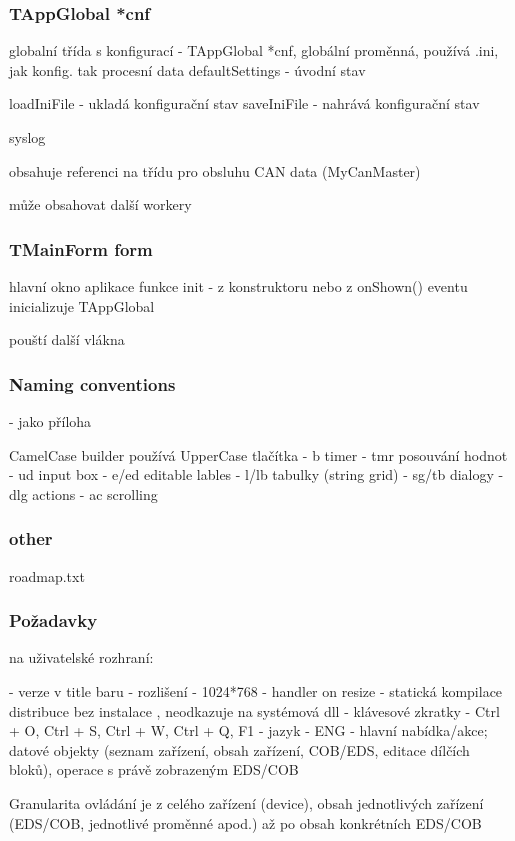 \documentclass[
  field=ainfk,
  biblatex,
  glossaries,
  index
]{kidiplom}
\begin{document}
\subsubsection{TAppGlobal *cnf}

globalní třída s konfigurací - TAppGlobal *cnf, globální proměnná, používá .ini, jak konfig. tak procesní data
defaultSettings - úvodní stav

loadIniFile - ukladá konfigurační stav
saveIniFile - nahrává konfigurační stav

syslog

obsahuje referenci na třídu pro obsluhu CAN data (MyCanMaster)

může obsahovat další workery

\subsubsection{TMainForm form}
hlavní okno aplikace
funkce init - z konstruktoru nebo z onShown() eventu
inicializuje TAppGlobal

pouští další vlákna

\subsubsection*{Naming conventions}
- jako příloha

CamelCase
builder používá UpperCase
tlačítka - b
timer - tmr
posouvání hodnot - ud
input box - e/ed
editable lables - l/lb
tabulky (string grid) - sg/tb
dialogy - dlg
actions - ac
scrolling


\subsubsection*{other}
roadmap.txt

\subsubsection{Požadavky}

na uživatelské rozhraní:

- verze v title baru
- rozlišení - 1024*768
- handler on resize
- statická kompilace distribuce bez instalace , neodkazuje na systémová dll
- klávesové zkratky - Ctrl + O, Ctrl + S, Ctrl + W, Ctrl + Q, F1
- jazyk - ENG
- hlavní nabídka/akce; datové objekty (seznam zařízení, obsah zařízení, COB/EDS, editace dílčích bloků), operace s právě zobrazeným EDS/COB

Granularita ovládání je z celého zařízení (device), obsah jednotlivých zařízení (EDS/COB, jednotlivé proměnné apod.) až po obsah konkrétních EDS/COB
\end{document}
